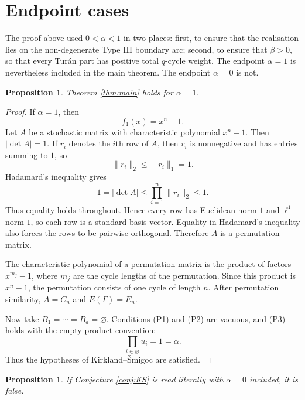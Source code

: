 \documentclass[11pt]{article}
\numberwithin{equation}{section}
\newtheorem{proposition}[theorem]{Proposition}
\begin{document}
\section{Endpoint cases}\label{sec:endpoints}

The proof above used $0<\alpha<1$ in two places: first, to ensure that the
realisation lies on the non-degenerate Type III boundary arc; second, to
ensure that $\beta>0$, so that every Tur\'an part has positive total
$q$-cycle weight. The endpoint $\alpha=1$ is nevertheless included in the main
theorem. The endpoint $\alpha=0$ is not.

\begin{proposition}
Theorem \ref{thm:main} holds for $\alpha=1$.
\end{proposition}

\begin{proof}
If $\alpha=1$, then
\[
        f_1(x)=x^n-1.
\]
Let $A$ be a stochastic matrix with characteristic polynomial $x^n-1$. Then
$|\det A|=1$. If $r_i$ denotes the $i$th row of $A$, then $r_i$ is
nonnegative and has entries summing to $1$, so
\[
        \|r_i\|_2\le \|r_i\|_1=1.
\]
Hadamard's inequality gives
\[
        1=|\det A|\le\prod_{i=1}^n\|r_i\|_2\le1.
\]
Thus equality holds throughout. Hence every row has Euclidean norm $1$ and
$\ell^1$-norm $1$, so each row is a standard basis vector. Equality in
Hadamard's inequality also forces the rows to be pairwise orthogonal.
Therefore $A$ is a permutation matrix.

The characteristic polynomial of a permutation matrix is the product of
factors $x^{m_j}-1$, where $m_j$ are the cycle lengths of the permutation.
Since this product is $x^n-1$, the permutation consists of one cycle of length
$n$. After permutation similarity, $A=C_n$ and $E(\Gamma)=E_n$.

Now take $B_1=\cdots=B_d=\varnothing$. Conditions (P1) and (P2) are
vacuous, and (P3) holds with the empty-product convention:
\[
        \prod_{i\in\varnothing}u_i=1=\alpha.
\]
Thus the hypotheses of Kirkland--\v{S}migoc
\cite[Proposition 7.1]{KirklandSmigoc} are satisfied.
\end{proof}

\begin{proposition}
If Conjecture \ref{conj:KS} is read literally with $\alpha=0$ included, it is
false.
\end{proposition}
\end{document}
